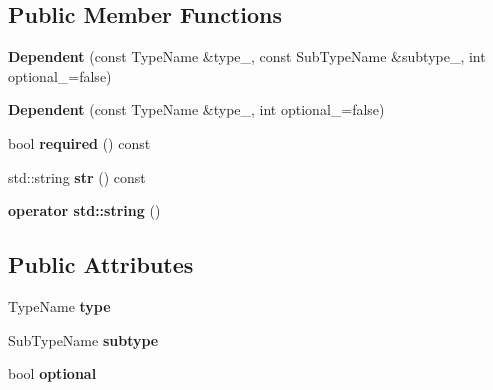 \subsection*{Public Member Functions}
\begin{DoxyCompactItemize}
\item 
\hypertarget{structtheoria_1_1core_1_1Dependencies_1_1Dependent_a25a03961885377f8d61f235968de9d7a}{{\bfseries Dependent} (const Type\+Name \&type\+\_\+, const Sub\+Type\+Name \&subtype\+\_\+, int optional\+\_\+=false)}\label{structtheoria_1_1core_1_1Dependencies_1_1Dependent_a25a03961885377f8d61f235968de9d7a}

\item 
\hypertarget{structtheoria_1_1core_1_1Dependencies_1_1Dependent_ac2d4b0f74da74e8e8b33690354a4c245}{{\bfseries Dependent} (const Type\+Name \&type\+\_\+, int optional\+\_\+=false)}\label{structtheoria_1_1core_1_1Dependencies_1_1Dependent_ac2d4b0f74da74e8e8b33690354a4c245}

\item 
\hypertarget{structtheoria_1_1core_1_1Dependencies_1_1Dependent_a2718fb0114fe1f185051bfb35d441518}{bool {\bfseries required} () const }\label{structtheoria_1_1core_1_1Dependencies_1_1Dependent_a2718fb0114fe1f185051bfb35d441518}

\item 
\hypertarget{structtheoria_1_1core_1_1Dependencies_1_1Dependent_a2226eeac97d0b57bfdeaed91442cdc86}{std\+::string {\bfseries str} () const }\label{structtheoria_1_1core_1_1Dependencies_1_1Dependent_a2226eeac97d0b57bfdeaed91442cdc86}

\item 
\hypertarget{structtheoria_1_1core_1_1Dependencies_1_1Dependent_ac6116c1e0f4083636db2f170d8cd1938}{{\bfseries operator std\+::string} ()}\label{structtheoria_1_1core_1_1Dependencies_1_1Dependent_ac6116c1e0f4083636db2f170d8cd1938}

\end{DoxyCompactItemize}
\subsection*{Public Attributes}
\begin{DoxyCompactItemize}
\item 
\hypertarget{structtheoria_1_1core_1_1Dependencies_1_1Dependent_a9a4198c7cffacace0d8971a6ae5536b3}{Type\+Name {\bfseries type}}\label{structtheoria_1_1core_1_1Dependencies_1_1Dependent_a9a4198c7cffacace0d8971a6ae5536b3}

\item 
\hypertarget{structtheoria_1_1core_1_1Dependencies_1_1Dependent_a2748915ec9980f392a2092b4bc1c3a1a}{Sub\+Type\+Name {\bfseries subtype}}\label{structtheoria_1_1core_1_1Dependencies_1_1Dependent_a2748915ec9980f392a2092b4bc1c3a1a}

\item 
\hypertarget{structtheoria_1_1core_1_1Dependencies_1_1Dependent_a81f5f761e3b6b5db488126b909d60601}{bool {\bfseries optional}}\label{structtheoria_1_1core_1_1Dependencies_1_1Dependent_a81f5f761e3b6b5db488126b909d60601}

\end{DoxyCompactItemize}


